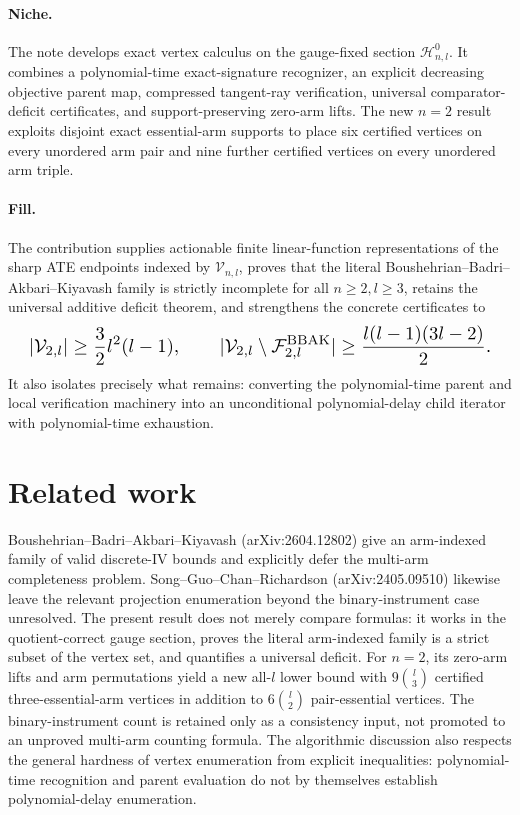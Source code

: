 \documentclass{article}
\begin{document}
\paragraph{Niche.} The note develops exact vertex calculus on the gauge-fixed section \(\mathcal H^0_{n,l}\). It combines a polynomial-time exact-signature recognizer, an explicit decreasing objective parent map, compressed tangent-ray verification, universal comparator-deficit certificates, and support-preserving zero-arm lifts. The new \(n=2\) result exploits disjoint exact essential-arm supports to place six certified vertices on every unordered arm pair and nine further certified vertices on every unordered arm triple.

\paragraph{Fill.} The contribution supplies actionable finite linear-function representations of the sharp ATE endpoints indexed by \(\mathcal V_{n,l}\), proves that the literal Boushehrian--Badri--Akbari--Kiyavash family is strictly incomplete for all \(n\ge2,l\ge3\), retains the universal additive deficit theorem, and strengthens the concrete certificates to
\[
\makebox[\linewidth][c]{\resizebox{0.98\linewidth}{!}{\par\noindent \makebox[\linewidth][c]{\resizebox{0.98\linewidth}{!}{\(\displaystyle \displaystyle |\mathcal V_{2,l}|\ge\frac32l^2(l-1),\qquad |\mathcal V_{2,l}\setminus\mathcal F^{\mathrm{BBAK}}_{2,l}|\ge\frac{l(l-1)(3l-2)}2.\)}}\par\noindent}}
\]
It also isolates precisely what remains: converting the polynomial-time parent and local verification machinery into an unconditional polynomial-delay child iterator with polynomial-time exhaustion.

\section{Related work}

Boushehrian--Badri--Akbari--Kiyavash (arXiv:2604.12802) give an arm-indexed family of valid discrete-IV bounds and explicitly defer the multi-arm completeness problem. Song--Guo--Chan--Richardson (arXiv:2405.09510) likewise leave the relevant projection enumeration beyond the binary-instrument case unresolved. The present result does not merely compare formulas: it works in the quotient-correct gauge section, proves the literal arm-indexed family is a strict subset of the vertex set, and quantifies a universal deficit. For \(n=2\), its zero-arm lifts and arm permutations yield a new all-\(l\) lower bound with \(9\binom l3\) certified three-essential-arm vertices in addition to \(6\binom l2\) pair-essential vertices. The binary-instrument count is retained only as a consistency input, not promoted to an unproved multi-arm counting formula. The algorithmic discussion also respects the general hardness of vertex enumeration from explicit inequalities: polynomial-time recognition and parent evaluation do not by themselves establish polynomial-delay enumeration.
\end{document}
